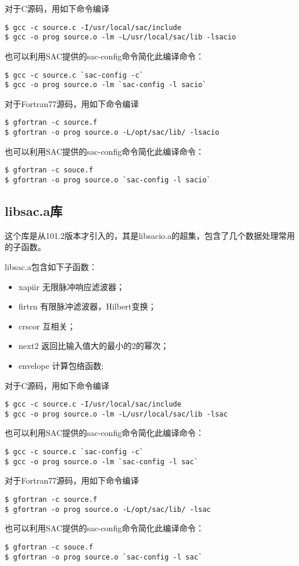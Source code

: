 对于C源码，用如下命令编译
\begin{lstlisting}[style=Shell]
$ gcc -c source.c -I/usr/local/sac/include
$ gcc -o prog source.o -lm -L/usr/local/sac/lib -lsacio
\end{lstlisting}
也可以利用SAC提供的sac-config命令简化此编译命令：
\begin{lstlisting}[style=Shell]
$ gcc -c source.c `sac-config -c`
$ gcc -o prog source.o -lm `sac-config -l sacio`
\end{lstlisting}

对于Fortran77源码，用如下命令编译
\begin{lstlisting}[style=Shell]
$ gfortran -c source.f
$ gfortran -o prog source.o -L/opt/sac/lib/ -lsacio
\end{lstlisting}
也可以利用SAC提供的sac-config命令简化此编译命令：
\begin{lstlisting}[style=Shell]
$ gfortran -c souce.f
$ gfortran -o prog source.o `sac-config -l sacio`
\end{lstlisting}

\subsection{libsac.a库}
这个库是从101.2版本才引入的，其是libsacio.a的超集，包含了几个数据处理常用的子函数。

libsac.a包含如下子函数：
\begin{itemize}
\item xapiir  无限脉冲响应滤波器；
\item firtrn  有限脉冲滤波器，Hilbert变换；
\item crscor  互相关；
\item next2   返回比输入值大的最小的2的幂次；
\item envelope 计算包络函数; 
\end{itemize}

对于C源码，用如下命令编译
\begin{lstlisting}[style=Shell]
$ gcc -c source.c -I/usr/local/sac/include
$ gcc -o prog source.o -lm -L/usr/local/sac/lib -lsac
\end{lstlisting}
也可以利用SAC提供的sac-config命令简化此编译命令：
\begin{lstlisting}[style=Shell]
$ gcc -c source.c `sac-config -c`
$ gcc -o prog source.o -lm `sac-config -l sac`
\end{lstlisting}

对于Fortran77源码，用如下命令编译
\begin{lstlisting}[style=Shell]
$ gfortran -c source.f
$ gfortran -o prog source.o -L/opt/sac/lib/ -lsac
\end{lstlisting}
也可以利用SAC提供的sac-config命令简化此编译命令：
\begin{lstlisting}[style=Shell]
$ gfortran -c souce.f
$ gfortran -o prog source.o `sac-config -l sac`
\end{lstlisting}

